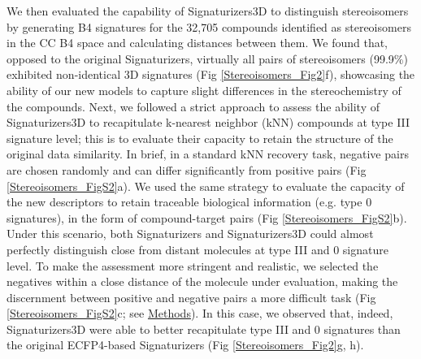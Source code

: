 We then evaluated the capability of Signaturizers3D to distinguish stereoisomers by generating B4 signatures for the 32,705 compounds identified as stereoisomers in the CC B4 space and calculating distances between them. We found that, opposed to the original Signaturizers, virtually all pairs of stereoisomers (99.9\%) exhibited non-identical 3D signatures (Fig \ref{Stereoisomers_Fig2}f), showcasing the ability of our new models to capture slight differences in the stereochemistry of the compounds. Next, we followed a strict approach to assess the ability of Signaturizers3D to recapitulate k-nearest neighbor (kNN) compounds at type III signature level; this is to evaluate their capacity to retain the structure of the original data similarity. In brief, in a standard kNN recovery task, negative pairs are chosen randomly and can differ significantly from positive pairs (Fig \ref{Stereoisomers_FigS2}a). We used the same strategy to evaluate the capacity of the new descriptors to retain traceable biological information (e.g. type 0 signatures), in the form of compound-target pairs (Fig \ref{Stereoisomers_FigS2}b). Under this scenario, both Signaturizers and Signaturizers3D could almost perfectly distinguish close from distant molecules at type III and 0 signature level. To make the assessment more stringent and realistic, we selected the negatives within a close distance of the molecule under evaluation, making the discernment between positive and negative pairs a more difficult task (Fig \ref{Stereoisomers_FigS2}c; see \hyperref[Stereoisomers_Methods]{Methods}). In this case, we observed that, indeed, Signaturizers3D were able to better recapitulate type III and 0 signatures than the original ECFP4-based Signaturizers (Fig \ref{Stereoisomers_Fig2}g, h).